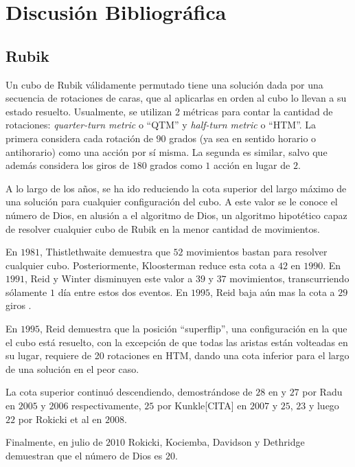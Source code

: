 \chapter{Discusión Bibliográfica}

\section*{Rubik}
Un cubo de Rubik válidamente permutado tiene una solución dada por una secuencia de rotaciones de caras, que al aplicarlas en orden al cubo lo llevan a su estado resuelto. Usualmente, se utilizan 2 métricas para contar la cantidad de rotaciones: \emph{quarter-turn metric} o ``QTM''\cite{qtm} y \emph{half-turn metric} o ``HTM''\cite{htm}. La primera considera cada rotación de $90$ grados (ya sea en sentido horario o antihorario) como una acción por sí misma. La segunda es similar, salvo que además considera los giros de $180$ grados como $1$ acción en lugar de $2$.

A lo largo de los años, se ha ido reduciendo la cota superior del largo máximo de una solución para cualquier configuración del cubo. A este valor se le conoce el número de Dios, en alusión a el algoritmo de Dios, un algoritmo hipotético capaz de resolver cualquier cubo de Rubik en la menor cantidad de movimientos\cite{godalgorithm}.

En $1981$, Thistlethwaite\cite{thistlethwaite} demuestra que $52$ movimientos bastan para resolver cualquier cubo. Posteriormente, Kloosterman\cite{kloosterman} reduce esta cota a $42$ en $1990$. En $1991$, Reid y Winter disminuyen este valor a $39$ y $37$ movimientos, transcurriendo sólamente $1$ día entre estos dos eventos\cite{reid39}\cite{winter}. En $1995$, Reid baja aún mas la cota a $29$ giros \cite{reid29}.

En $1995$, Reid demuestra que la posición ``superflip'', una configuración en la que el cubo está resuelto, con la excepción de que todas las aristas están volteadas en su lugar, requiere de 20 rotaciones\cite{superflip} en HTM, dando una cota inferior para el largo de una solución en el peor caso.

La cota superior continuó descendiendo, demostrándose de $28$ en y $27$ por Radu\cite{radu28}\cite{radu27} en $2005$ y $2006$ respectivamente, $25$ por Kunkle[CITA] en $2007$ y $25$, $23$ y luego $22$ por Rokicki\cite{rokicki25}\cite{rokicki23}\cite{rokicki22} et al en $2008$.

Finalmente, en julio de $2010$ Rokicki, Kociemba, Davidson y Dethridge demuestran que el número de Dios es $20$\cite{godnumber20}.

